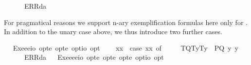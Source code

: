 \begin{isabellebody}
\ \ \ \ {\isacharunderscore}\ {\isasymRightarrow}\ ERR{\isacharparenleft}da{\isacharparenright}{\isachardoublequoteclose}%
\begin{isamarkuptext}%
For pragmatical reasons we support n-ary exemplification formulas  here only for .
 In addition to the unary case above, we thus introduce two further cases.%
\end{isamarkuptext}\isamarkuptrue%
\ \isamarkupfalse%
\ Exe{}{\isacharcolon}{\isacharcolon}{\isachardoublequoteopen}{\isacharparenleft}e{\isasymRightarrow}e{\isasymRightarrow}io{\isacharparenright}\ opt{\isasymRightarrow}e\ opt{\isasymRightarrow}e\ opt{\isasymRightarrow}io\ opt{\isachardoublequoteclose}\ {\isacharparenleft}{\isachardoublequoteopen}{\isasymlparr}{\isacharunderscore}{\isacharcomma}{\isacharunderscore}{\isacharcomma}{\isacharunderscore}{\isasymrparr}{\isachardoublequoteclose}{\isacharparenright}\isanewline
\ \ \ {\isachardoublequoteopen}{\isasymlparr}{\isasymPhi}{\isacharcomma}x{}{\isacharcomma}x{}{\isasymrparr}\ {\isasymequiv}\ case\ {\isacharparenleft}{\isasymPhi}{\isacharcomma}x{}{\isacharcomma}x{}{\isacharparenright}\ of\ \isanewline
\ \ \ \ {\isacharparenleft}T{\isacharparenleft}Q{\isacharparenright}{\isacharcomma}T{\isacharparenleft}y{}{\isacharparenright}{\isacharcomma}T{\isacharparenleft}y{}{\isacharparenright}{\isacharparenright}\ {\isasymRightarrow}\ P{\isacharparenleft}{\isacharparenleft}Q\ y{}\ y{}{\isacharparenright}{\isacharparenright}\ {\isacharbar}\ \isanewline
\ \ \ \ {\isacharunderscore}\ {\isasymRightarrow}\ ERR{\isacharparenleft}da{\isacharparenright}{\isachardoublequoteclose}\isanewline
\ \isamarkupfalse%
\ Exe{}{\isacharcolon}{\isacharcolon}{\isachardoublequoteopen}{\isacharparenleft}e{\isasymRightarrow}e{\isasymRightarrow}e{\isasymRightarrow}io{\isacharparenright}\ opt{\isasymRightarrow}e\ opt{\isasymRightarrow}e\ opt{\isasymRightarrow}e\ opt{\isasymRightarrow}io\ opt{\isachardoublequoteclose}\ {\isacharparenleft}{\isachardoublequoteopen}{\isasymlparr}{\isacharunderscore}{\isacharcomma}{\isacharunderscore}{\isacharcomma}{\isacharunderscore}{\isacharcomma}{\isacharunderscore}{\isasymrparr}{\isachardoublequoteclose}{\isacharparenright}\ \isanewline

\end{isabellebody}
